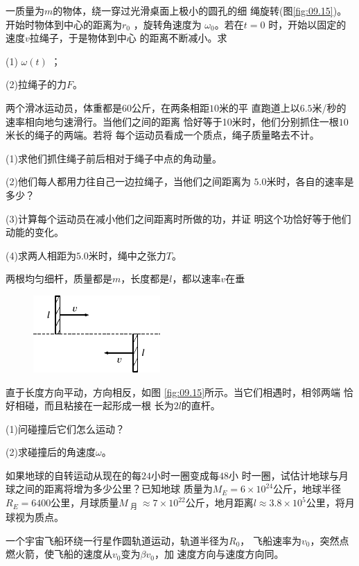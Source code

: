 \begin{exercises}
\clearpage
\exercise 一质量为$ m $的物体，绕一穿过光滑桌面上极小的圆孔的细
绳旋转(图\ref{fig:09.15})。开始时物体到中心的距离为$  r _ { 0 }  $ ，旋转角速度为
$ \omega _ { 0 } $。若在$  t = 0  $ 时，开始以固定的速度$ v $拉绳子，于是物体到中心
的距离不断减小。求

(1) $ \omega \left( t \right) $ ；

(2)拉绳子的力$ F $。

\exercise 两个滑冰运动员，体重都是$ 60 $公斤，在两条相距$ 10 $米的平
直跑道上以$ 6.5 $米/秒的速率相向地匀速滑行。当他们之间的距离
恰好等于10米时，他们分别抓住一根$ 10 $米长的绳子的两端。若将
每个运动员看成一个质点，绳子质量略去不计。

(1)求他们抓住绳子前后相对于绳子中点的角动量。

(2)他们每人都用力往自己一边拉绳子，当他们之间距离为
$ 5.0 $米时，各自的速率是多少？

(3)计算每个运动员在减小他们之间距离时所做的功，并证
明这个功恰好等于他们动能的变化。

(4)求两人相距为$ 5.0 $米时，绳中之张力$ T $。

\exercise 两根均匀细杆，质量都是$ m $，长度都是$ l $，都以速率$ v $在垂
\begin{figure}
    \centering
    \includegraphics{figure/fig09.16}
    \caption{}
    \label{fig:09.16}
\end{figure}
直于长度方向平动，方向相反，如图
\ref{fig:09.15}所示。当它们相遇时，相邻两端
恰好相碰，而且粘接在一起形成一根
长为$ 2 l $的直杆。

(1)问碰撞后它们怎么运动？

(2)求碰撞后的角速度$ \omega $。

\exercise 如果地球的自转运动从现在的每$ 24 $小时一圈变成每$ 48 $小
时一圈，试估计地球与月球之间的距离将增为多少公里？已知地球
质量为$  M _ { E } = 6 \times 1 0 ^ { 2 4 } $公斤，地球半径$  R _ { E } = 6 4 0 0   $公里，月球质量$ M _ \text{ 月 }
\approx 7 \times 1 0 ^ { 2 2 } $公斤，地月距离$ l \approx 3 . 8 \times 1 0 ^ { 5 } $公里，将月球视为质点。

\exercise 一个宇宙飞船环绕一行星作圆轨道运动，轨道半径为$ R _ 0 $，
飞船速率为$  v _ { 0 }   $，突然点燃火箭，使飞船的速度从$  v _ { 0 }   $变为$  \beta v _ { 0 }   $，加
速度方向与速度方向同。


\end{exercises}
